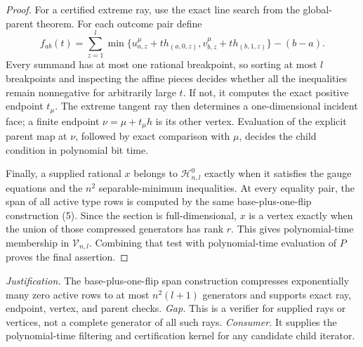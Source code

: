 \documentclass{article}
\begin{document}
\begin{proof}
For a certified extreme ray, use the exact line search from the global-parent theorem. For each outcome pair define
\[f_{ab}(t)=\sum_{z=1}^l\min\{u^\mu_{a,z}+t h_{(a,0,z)},v^\mu_{b,z}+t h_{(b,1,z)}\}-(b-a).\tag{6}\]
Every summand has at most one rational breakpoint, so sorting at most \(l\) breakpoints and inspecting the affine pieces decides whether all the inequalities remain nonnegative for arbitrarily large \(t\). If not, it computes the exact positive endpoint \(t_\mu\). The extreme tangent ray then determines a one-dimensional incident face; a finite endpoint \(\nu=\mu+t_\mu h\) is its other vertex. Evaluation of the explicit parent map at \(\nu\), followed by exact comparison with \(\mu\), decides the child condition in polynomial bit time.

Finally, a supplied rational \(x\) belongs to \(\mathcal H^0_{n,l}\) exactly when it satisfies the gauge equations and the \(n^2\) separable-minimum inequalities. At every equality pair, the span of all active type rows is computed by the same base-plus-one-flip construction (5). Since the section is full-dimensional, \(x\) is a vertex exactly when the union of those compressed generators has rank \(r\). This gives polynomial-time membership in \(\mathcal V_{n,l}\). Combining that test with polynomial-time evaluation of \(P\) proves the final assertion.
\end{proof}
\par\smallskip\noindent \textit{Justification.} The base-plus-one-flip span construction compresses exponentially many zero active rows to at most \(n^2(l+1)\) generators and supports exact ray, endpoint, vertex, and parent checks. \textit{Gap.} This is a verifier for supplied rays or vertices, not a complete generator of all such rays. \textit{Consumer.} It supplies the polynomial-time filtering and certification kernel for any candidate child iterator.
\end{document}
